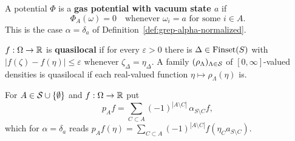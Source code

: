 \begin{definition}
    \label{def:grep-gas-potential}
    \leanok

    A potential $\Phi$ is a \textbf{gas potential with vacuum state $a$} if
    \[
        \Phi_A(\omega) = 0 \quad \text{whenever } \omega_i = a \text{ for some } i \in A .
    \]
    This is the case $\alpha = \delta_a$ of Definition~\ref{def:grep-alpha-normalized}.
\end{definition}

\begin{definition}
    \label{def:grep-quasilocal-fun}
    \leanok

    $f : \Omega \to \mathbb{R}$ is \textbf{quasilocal} if for every $\varepsilon > 0$ there is
    $\Delta \in \operatorname{Finset}(S)$ with $|f(\zeta) - f(\eta)| \leq \varepsilon$ whenever
    $\zeta_\Delta = \eta_\Delta$.  A family $(\rho_\Lambda)_{\Lambda \in \mathcal{S}}$ of
    $[0,\infty]$-valued densities is quasilocal if each real-valued function
    $\eta \mapsto \rho_\Lambda(\eta)$ is.
\end{definition}

\begin{definition}
    \label{def:grep-mobius}
    \leanok

    For $A \in \mathcal{S} \cup \left\{ \emptyset \right\}$ and $f : \Omega \to \mathbb{R}$ put
    \[
        p_A f = \sum_{C \subset A} (-1)^{|A \setminus C|}\, \alpha_{S \setminus C} f ,
    \]
    which for $\alpha = \delta_a$ reads
    $p_A f(\eta) = \sum_{C \subset A} (-1)^{|A\setminus C|} f(\eta_C a_{S \setminus C})$.
\end{definition}

